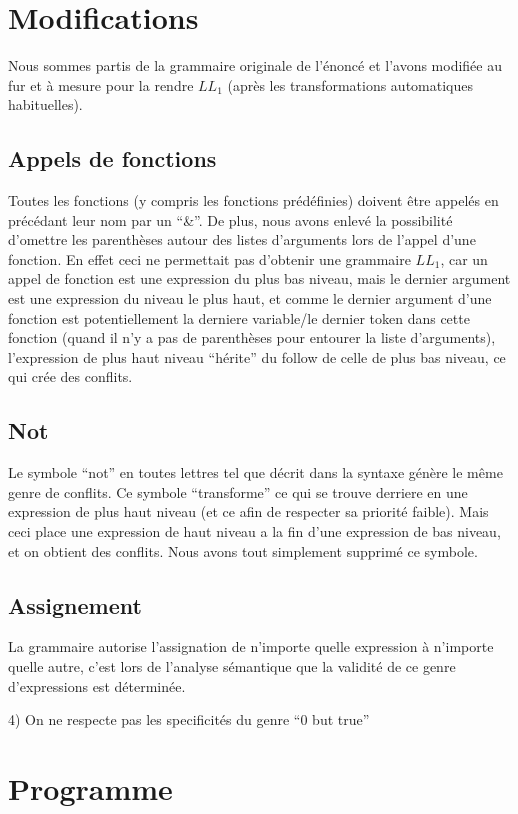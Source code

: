 \documentclass[a4paper,10pt]{article}
\begin{document}
\section{Modifications}

	Nous sommes partis de la grammaire originale de l'énoncé et l'avons
	modifiée au fur et à mesure pour la rendre $LL_1$ (après les transformations
	automatiques habituelles).

	\subsection{Appels de fonctions}
		Toutes les fonctions (y compris les fonctions prédéfinies) doivent être
		appelés en précédant leur nom par un ``&''. De plus, nous avons enlevé la
		possibilité d'omettre les parenthèses autour des listes	d'arguments lors de
		l'appel d'une fonction. En effet ceci ne permettait pas d'obtenir une
		grammaire $LL_1$, car un appel de fonction est une expression du plus bas
		niveau, mais le dernier argument est une expression du niveau le plus haut, et
		comme le dernier argument d'une fonction est potentiellement la derniere
		variable/le dernier token dans cette fonction (quand il n'y a pas de
		parenthèses pour entourer la liste d'arguments), l'expression de plus haut
		niveau ``hérite'' du follow de celle de plus bas niveau, ce qui crée des
		conflits.
	
	\subsection{Not}
		Le symbole ``not'' en toutes lettres tel que décrit dans la syntaxe génère le
		même genre de conflits. Ce symbole ``transforme'' ce qui se trouve derriere en
		une expression de plus haut niveau (et ce afin de respecter sa priorité
		faible). Mais ceci place une expression de haut niveau a la fin d'une
		expression de bas niveau, et on obtient des conflits. Nous avons tout
		simplement supprimé ce symbole.
		
	\subsection{Assignement} 
		La grammaire autorise l'assignation de n'importe quelle
		expression à n'importe quelle autre, c'est lors de l'analyse sémantique
		que la validité de ce genre d'expressions est déterminée.

4) On ne respecte pas les specificités du genre ``0 but true''

\section{Programme}
\end{document}

